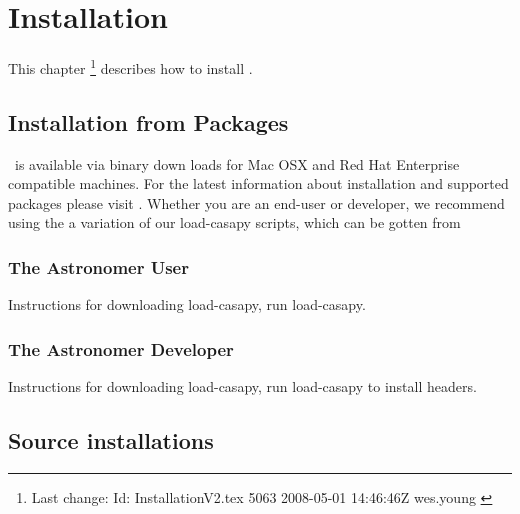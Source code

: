 \chapter{Installation}
\label{Installation}

This chapter \footnote{Last change:
$ $Id: InstallationV2.tex 5063 2008-05-01 14:46:46Z wes.young $ $}
describes how to install \aipspp.

\section{Installation from Packages}
\casa\ is available via binary down loads for Mac OSX and Red Hat
Enterprise compatible machines.
For the latest information about installation and supported packages
please visit . Whether you are an end-user or
developer, we recommend using the a variation of our load-casapy scripts,
which can be gotten from 

\subsection{The Astronomer User}
\label{End-user installation}
\label{Astronomer installation}

Instructions for downloading load-casapy, run load-casapy.

\subsection{The Astronomer Developer}
\label{developers-release}

Instructions for downloading load-casapy, run load-casapy to install headers.


\section{Source \casa installations}
\label{Source installation}

